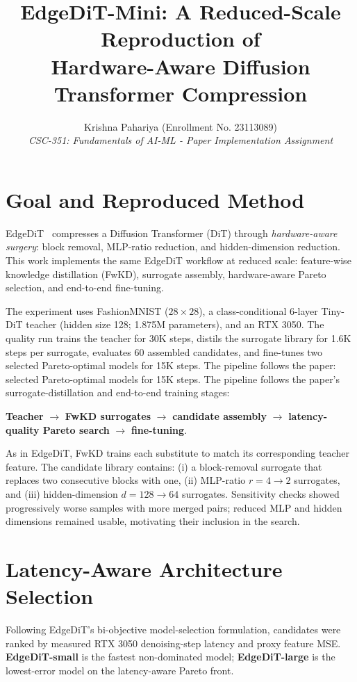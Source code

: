 \documentclass[9pt,twocolumn]{article}
\title{\vspace{-1.05em}\textbf{EdgeDiT-Mini: A Reduced-Scale Reproduction of\\
Hardware-Aware Diffusion Transformer Compression}\vspace{-0.65em}}
\author{Krishna Pahariya (Enrollment No. 23113089)\\
\textit{CSC-351: Fundamentals of AI-ML - Paper Implementation Assignment}}
\date{}
\begin{document}
\maketitle
\vspace{-1.25em}

\section{Goal and Reproduced Method}
EdgeDiT~\cite{edgedit} compresses a Diffusion Transformer (DiT) through
\textit{hardware-aware surgery}: block removal, MLP-ratio reduction, and
hidden-dimension reduction. This work implements the same EdgeDiT workflow at
reduced scale: feature-wise knowledge distillation (FwKD), surrogate assembly,
hardware-aware Pareto selection, and end-to-end fine-tuning.

The experiment uses FashionMNIST ($28\times28$), a class-conditional 6-layer
Tiny-DiT teacher (hidden size 128; 1.875M parameters), and an RTX 3050. The
quality run trains the teacher for 30K steps, distils the surrogate library for
1.6K steps per surrogate, evaluates 60 assembled candidates, and fine-tunes two
selected Pareto-optimal models for 15K steps. The pipeline follows the paper:
selected Pareto-optimal models for 15K steps. The pipeline follows the paper's
surrogate-distillation and end-to-end training stages:

\begin{center}
\scriptsize
\textbf{Teacher} $\rightarrow$ \textbf{FwKD surrogates} $\rightarrow$
\textbf{candidate assembly} $\rightarrow$ \textbf{latency-quality Pareto search}
$\rightarrow$ \textbf{fine-tuning}.
\end{center}
\vspace{-0.45em}

As in EdgeDiT, FwKD trains each substitute to match its corresponding teacher feature. The
candidate library contains: (i) a block-removal surrogate that replaces two
consecutive blocks with one, (ii) MLP-ratio $r=4\rightarrow2$ surrogates, and
(iii) hidden-dimension $d=128\rightarrow64$ surrogates. Sensitivity checks
showed progressively worse samples with more merged pairs; reduced MLP and
hidden dimensions remained usable, motivating their inclusion in the search.

\section{Latency-Aware Architecture Selection}
Following EdgeDiT's bi-objective model-selection formulation, candidates were
ranked by measured RTX 3050 denoising-step latency and proxy feature MSE.
\textbf{EdgeDiT-small} is the fastest non-dominated model; \textbf{EdgeDiT-large}
is the lowest-error model on the latency-aware Pareto front.
\end{document}
